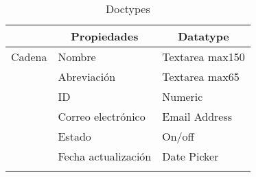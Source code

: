 \begin{longtable}{ | p{5em} | l | l | }
   \hline
   \rowcolor{blue!25}
   \multicolumn{1}{|c|}{Doctype} &
   \multicolumn{1}{|c|}{Propiedades} &
   \multicolumn{1}{|c|}{Datatype} \\
   \hline
   \endhead

   \hline
   \endfoot

   \endlastfoot

   Cadena
       & Nombre & Textarea max150 \\
       \cline{2-3}
       & Abreviación & Textarea max65 \\
       \cline{2-3}
       & ID & Numeric \\
       \cline{2-3}
       & Correo electrónico & Email Address \\
       \cline{2-3}
       & Estado & On/off \\
       \cline{2-3}
       & Fecha actualización & Date Picker \\
   \hline

   \caption{Doctypes}
   \label{table:doctypes}
\end{longtable}
